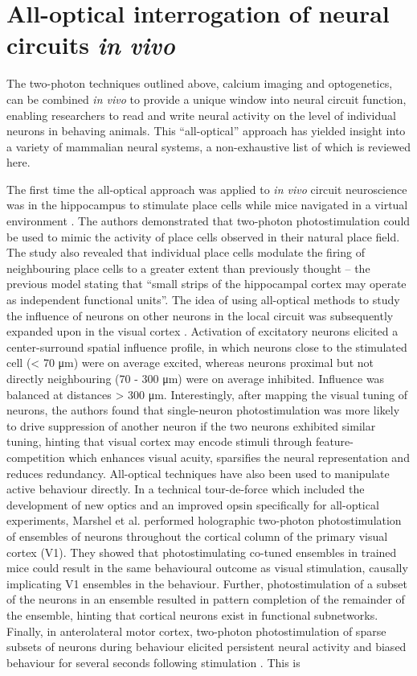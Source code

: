 \section{All-optical interrogation of neural circuits \textit{in vivo}}
 
The two-photon techniques outlined above, calcium imaging and optogenetics, can be combined \textit{in vivo} to provide a unique window into neural circuit function, enabling researchers to read and write neural activity on the level of individual neurons in behaving animals. This “all-optical” approach has yielded insight into a variety of mammalian neural systems, a non-exhaustive list of which is reviewed here.

The first time the all-optical approach was applied to \textit{in vivo} circuit neuroscience was in the hippocampus to stimulate place cells while mice navigated in a virtual environment \cite{rickgauer_simultaneous_2014}. The authors demonstrated that two-photon photostimulation could be used to mimic the activity of place cells observed in their natural place field. The study also revealed that individual place cells modulate the firing of neighbouring place cells to a greater extent than previously thought -- the previous model \cite{andersen_lamellar_1971} stating that “small strips of the hippocampal cortex may operate as independent functional units”. The idea of using all-optical methods to study the influence of neurons on other neurons in the local circuit was subsequently expanded upon in the visual cortex \cite{chettih_single-neuron_2019}. Activation of excitatory neurons elicited a center-surround spatial influence profile, in which neurons close to the stimulated cell (< 70 μm) were on average excited, whereas neurons proximal but not directly neighbouring (70 - 300 μm) were on average inhibited. Influence was balanced at distances > 300 μm. Interestingly, after mapping the visual tuning of neurons, the authors found that single-neuron photostimulation was more likely to drive suppression of another neuron if the two neurons exhibited similar tuning, hinting that visual cortex may encode stimuli through feature-competition which enhances visual acuity, sparsifies the neural representation and reduces redundancy. All-optical techniques have also been used to manipulate active behaviour directly. In a technical tour-de-force which included the development of new optics and an improved opsin specifically for all-optical experiments, Marshel et al. \cite{marshel_cortical_2019} performed holographic two-photon photostimulation of ensembles of neurons throughout the cortical column of the primary visual cortex (V1). They showed that photostimulating co-tuned ensembles in trained mice could result in the same behavioural outcome as visual stimulation, causally implicating V1 ensembles in the behaviour. Further, photostimulation of a subset of the neurons in an ensemble resulted in pattern completion of the remainder of the ensemble, hinting that cortical neurons exist in functional subnetworks. Finally, in anterolateral motor cortex, two-photon photostimulation of sparse subsets of neurons during behaviour elicited persistent neural activity and biased behaviour for several seconds following stimulation \cite{daie_targeted_2021}. This is 